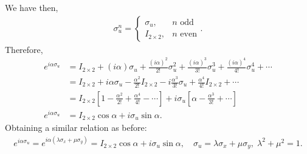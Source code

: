 \documentclass[letterpaper,11pt,twoside]{article}
\begin{document}
We have then,
\begin{align*}
  \sigma_u^n=\begin{cases}
    \sigma_u,&\text{$n$ odd}\\
    I_{2\times2},&\text{$n$ even}
  \end{cases}.
\end{align*}
Therefore,
\begin{align*}
  e^{i\alpha\sigma_u}&=I_{2\times2}+(i\alpha)\sigma_u+\frac{(i\alpha)^2}{2!}\sigma_u^2+\frac{(i\alpha)^3}{3!}\sigma_u^3+\frac{(i\alpha)^4}{4!}\sigma_u^4+\cdots\\
  &=I_{2\times2}+i\alpha\sigma_u-\frac{\alpha^2}{2!}I_{2\times2}-i\frac{\alpha^3}{3!}\sigma_u+\frac{\alpha^4}{4!}I_{2\times2}+\cdots\\
  &=I_{2\times2}\left[1-\frac{\alpha^2}{2!}+\frac{\alpha^4}{4!}-\cdots\right]+i\sigma_u\left[\alpha-\frac{\alpha^3}{3!}+\cdots\right]\\
  e^{i\alpha\sigma_u}&=I_{2\times2}\cos\alpha+i\sigma_u\sin\alpha.
\end{align*}
Obtaining a similar relation as before:
\begin{align}
  e^{i\alpha\sigma_u}=e^{i\alpha(\lambda\sigma_x+\mu\sigma_y)}=I_{2\times2}\cos\alpha+i\sigma_u\sin\alpha,\quad\sigma_u=\lambda\sigma_x+\mu\sigma_y,\;\lambda^2+\mu^2=1.
  \label{eq:formula}
\end{align}
\end{document}
